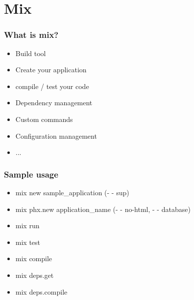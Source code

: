 \section{Mix}

\frame{\tableofcontents[currentsection]}

\begin{frame}
    \frametitle{What is mix?}   
    \begin{itemize}
        \item Build tool
        \item Create your application 
        \item compile / test your code
        \item Dependency management
        \item Custom commands
        \item Configuration management
        \item ...
    \end{itemize}
\end{frame}

\begin{frame}
    \frametitle{Sample usage}   
    \begin{itemize}
        \item mix new sample\_application (- - sup)
        \item mix phx.new application\_name (- - no-html, - - database)
        \vfill        
        \item mix run
        \item mix test
        \item mix compile
        \item mix deps.get
        \item mix deps.compile
    \end{itemize}
\end{frame}